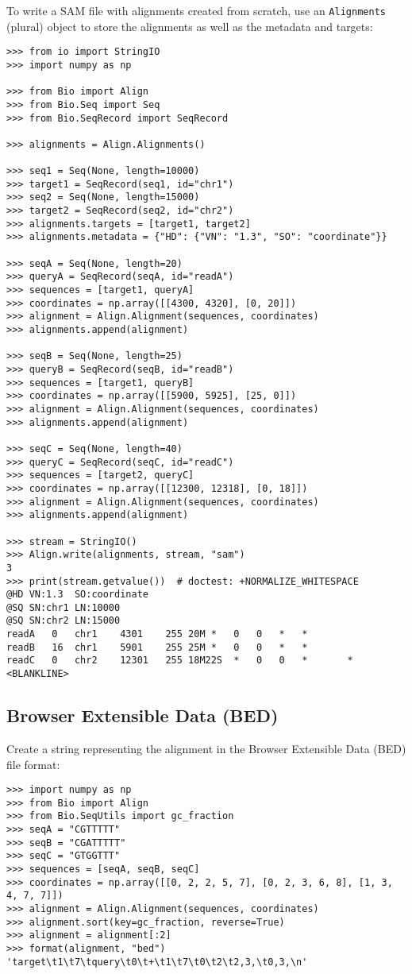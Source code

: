 To write a SAM file with alignments created from scratch, use an \verb|Alignments| (plural) object to store the alignments as well as the metadata and targets:
\begin{verbatim}
>>> from io import StringIO
>>> import numpy as np

>>> from Bio import Align
>>> from Bio.Seq import Seq
>>> from Bio.SeqRecord import SeqRecord

>>> alignments = Align.Alignments()

>>> seq1 = Seq(None, length=10000)
>>> target1 = SeqRecord(seq1, id="chr1")
>>> seq2 = Seq(None, length=15000)
>>> target2 = SeqRecord(seq2, id="chr2")
>>> alignments.targets = [target1, target2]
>>> alignments.metadata = {"HD": {"VN": "1.3", "SO": "coordinate"}}

>>> seqA = Seq(None, length=20)
>>> queryA = SeqRecord(seqA, id="readA")
>>> sequences = [target1, queryA]
>>> coordinates = np.array([[4300, 4320], [0, 20]])
>>> alignment = Align.Alignment(sequences, coordinates)
>>> alignments.append(alignment)

>>> seqB = Seq(None, length=25)
>>> queryB = SeqRecord(seqB, id="readB")
>>> sequences = [target1, queryB]
>>> coordinates = np.array([[5900, 5925], [25, 0]])
>>> alignment = Align.Alignment(sequences, coordinates)
>>> alignments.append(alignment)

>>> seqC = Seq(None, length=40)
>>> queryC = SeqRecord(seqC, id="readC")
>>> sequences = [target2, queryC]
>>> coordinates = np.array([[12300, 12318], [0, 18]])
>>> alignment = Align.Alignment(sequences, coordinates)
>>> alignments.append(alignment)

>>> stream = StringIO()
>>> Align.write(alignments, stream, "sam")
3
>>> print(stream.getvalue())  # doctest: +NORMALIZE_WHITESPACE
@HD	VN:1.3	SO:coordinate
@SQ	SN:chr1	LN:10000
@SQ	SN:chr2	LN:15000
readA	0	chr1	4301	255	20M	*	0	0	*	*
readB	16	chr1	5901	255	25M	*	0	0	*	*
readC	0	chr2	12301	255	18M22S	*	0	0	*       *
<BLANKLINE>
\end{verbatim}

\subsection{Browser Extensible Data (BED)}
\label{subsec:align_bed}

Create a string representing the alignment in the Browser Extensible Data (BED) file format:
\begin{verbatim}
>>> import numpy as np
>>> from Bio import Align
>>> from Bio.SeqUtils import gc_fraction
>>> seqA = "CGTTTTT"
>>> seqB = "CGATTTTT"
>>> seqC = "GTGGTTT"
>>> sequences = [seqA, seqB, seqC]
>>> coordinates = np.array([[0, 2, 2, 5, 7], [0, 2, 3, 6, 8], [1, 3, 4, 7, 7]])
>>> alignment = Align.Alignment(sequences, coordinates)
>>> alignment.sort(key=gc_fraction, reverse=True)
>>> alignment = alignment[:2]
>>> format(alignment, "bed")
'target\t1\t7\tquery\t0\t+\t1\t7\t0\t2\t2,3,\t0,3,\n'
\end{verbatim}

